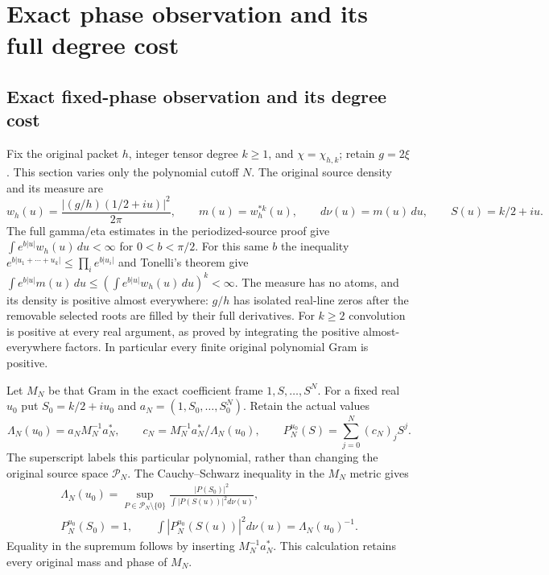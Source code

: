 \begingroup

\section{Exact phase observation and its full degree cost}


\subsection{Exact fixed-phase observation and its degree cost}
\label{sec:holonomy-degree-cost}

Fix the original packet $h$, integer tensor degree $k\ge1$, and
$\chi=\chi_{h,k}$; retain $g=2\xi$. This section varies only the
polynomial cutoff $N$. The original source density and its measure are
\[
 w_h(u)=\frac{|(g/h)(1/2+iu)|^2}{2\pi},\qquad
 m(u)=w_h^{*k}(u),\qquad d\nu(u)=m(u)\,du,
 \qquad S(u)=k/2+iu .
 \tag{HD1}
\]
The full gamma/eta estimates in the periodized-source proof give
$\int e^{b|u|}w_h(u)\,du<\infty$ for $0<b<\pi/2$.
For this same $b$ the inequality
$e^{b|u_1+\cdots+u_k|}\le\prod_i e^{b|u_i|}$ and Tonelli's theorem
give
$\int e^{b|u|}m(u)\,du\le(\int e^{b|u|}w_h(u)\,du)^k<\infty$.
The measure has no atoms, and its density is positive almost everywhere:
$g/h$ has isolated real-line zeros after the removable selected roots
are filled by their full derivatives. For $k\ge2$ convolution is
positive at every real argument, as proved by integrating the positive
almost-everywhere factors. In particular every finite original
polynomial Gram is positive.

Let $M_N$ be that Gram in the exact coefficient frame
$1,S,\ldots,S^N$. For a fixed real $u_0$ put $S_0=k/2+iu_0$ and
$a_N=(1,S_0,\ldots,S_0^N)$. Retain the actual values
\[
 \Lambda_N(u_0)=a_NM_N^{-1}a_N^*,\qquad
 c_N=M_N^{-1}a_N^*/\Lambda_N(u_0),\qquad
 P_N^{u_0}(S)=\sum_{j=0}^N(c_N)_j S^j .
 \tag{HD2}
\]
The superscript labels this particular polynomial, rather than changing
the original source space $\mathcal P_N$. The Cauchy--Schwarz inequality
in the $M_N$ metric gives
\[
\begin{gathered}
 \Lambda_N(u_0)=\sup_{P\in\mathcal P_N\setminus\{0\}}
    \frac{|P(S_0)|^2}{\int|P(S(u))|^2d\nu(u)},\\
 P_N^{u_0}(S_0)=1,\qquad
 \int|P_N^{u_0}(S(u))|^2d\nu(u)=\Lambda_N(u_0)^{-1}.
\end{gathered}\tag{HD3}
\]
Equality in the supremum follows by inserting $M_N^{-1}a_N^*$.
This calculation retains every original mass and phase of $M_N$.

